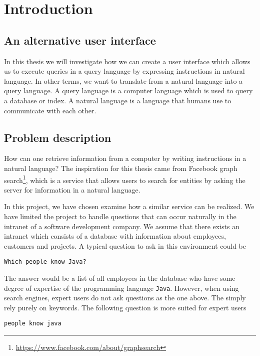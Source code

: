 \chapter{Introduction}\label{ch:introduction}
\section{An alternative user interface}
In this thesis we will investigate how we can create a user interface which allows us to execute queries in a query language by expressing instructions in natural language. In other terms, we want to translate from a natural language into a query language. A query language is a computer language which is used to query a database or index. A natural language is a language that humans use to communicate with each other.

\section{Problem description\label{sec:problem-description}}
How can one retrieve information from a computer by writing instructions in a natural language? The inspiration for this thesis came from Facebook graph search\footnote{\url{https://www.facebook.com/about/graphsearch}}, which is a service that allows users to search for entities by asking the server for information in a natural language.

In this project, we have chosen examine how a similar service can be realized. We have limited the project to handle questions that can occur naturally in the intranet of a software development company. We assume that there exists an intranet which consists of a database with information about employees, customers and projects. A typical question to ask in this environment could be

\begin{verbatim}
Which people know Java?
\end{verbatim}

The answer would be a list of all employees in the database who have some degree of expertise of the programming language \texttt{Java}. However, when using search engines, expert users do not ask questions as the one above. The simply rely purely on keywords. The following question is more suited for expert users

\begin{verbatim}
people know java
\end{verbatim}

